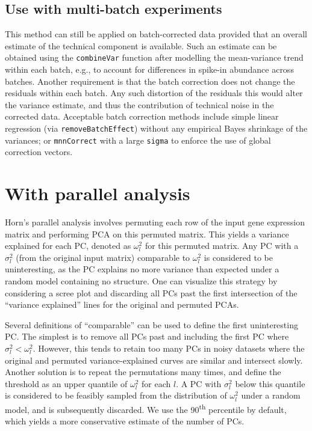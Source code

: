 \documentclass{article}
\begin{document}
\subsection{Use with multi-batch experiments}
This method can still be applied on batch-corrected data provided that an overall estimate of the technical component is available.
Such an estimate can be obtained using the \texttt{combineVar} function after modelling the mean-variance trend within each batch, 
e.g., to account for differences in spike-in abundance across batches.
Another requirement is that the batch correction does not change the residuals within each batch.
Any such distortion of the residuals this would alter the variance estimate, and thus the contribution of technical noise in the corrected data.
Acceptable batch correction methods include simple linear regression (via \texttt{removeBatchEffect}) without any empirical Bayes shrinkage of the variances;
or \texttt{mnnCorrect} with a large \texttt{sigma} to enforce the use of global correction vectors.

\section{With parallel analysis}
Horn's parallel analysis involves permuting each row of the input gene expression matrix and performing PCA on this permuted matrix.
This yields a variance explained for each PC, denoted as $\omega^2_l$ for this permuted matrix.
Any PC with a $\sigma^2_l$ (from the original input matrix) comparable to $\omega^2_l$ is considered to be uninteresting, 
as the PC explains no more variance than expected under a random model containing no structure. 
One can visualize this strategy by considering a scree plot and discarding all PCs past the first intersection of the ``variance explained'' lines for the original and permuted PCAs.

Several definitions of ``comparable'' can be used to define the first uninteresting PC.
The simplest is to remove all PCs past and including the first PC where $\sigma^2_l < \omega^2_l$.
However, this tends to retain too many PCs in noisy datasets where the original and permuted variance-explained curves are similar and intersect slowly.
Another solution is to repeat the permutations many times, and define the threshold as an upper quantile of $\omega^2_l$ for each $l$.
A PC with $\sigma^2_l$ below this quantile is considered to be feasibly sampled from the distribution of $\omega^2_l$ under a random model, and is subsequently discarded.
We use the 90\textsuperscript{th} percentile by default, which yields a more conservative estimate of the number of PCs.
\end{document}
